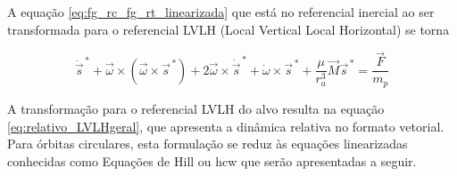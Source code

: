 A equação \eqref{eq:fg_rc_fg_rt_linearizada} que está no referencial inercial ao ser transformada para o referencial LVLH (Local Vertical Local Horizontal) se torna \cite{fehse2003}

\begin{equation}
\label{eq:relativo_LVLHgeral}
\ddot{\vec s}^{\,*}
+ \vec \omega \times (\vec \omega \times \vec{s}^{\,*})
+ 2 \vec \omega \times \dot{\vec s}^{\,*} 
+ \dot{\omega} \times \vec{s}^{\,*}
+ \frac{\mu}{r^3_a} \vec{M} \vec{s}^{\,*}
= \frac{\vec{F}}{m_p}
\end{equation}

A transformação para o referencial LVLH do alvo resulta na equação \eqref{eq:relativo_LVLHgeral}, que apresenta a dinâmica relativa no formato vetorial.
Para órbitas circulares, esta formulação se reduz às equações linearizadas conhecidas como Equações de Hill ou \gls{hcw} que serão apresentadas a seguir.








